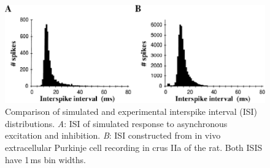 \documentclass[12pt]{article}
\begin{document}
\clearpage

\begin{figure}[h]
\centering
   \includegraphics[scale=0.75]{figures/Fig.2.8.eps}
   \caption{Comparison of simulated and experimental interspike interval (ISI) distributions. {\it A}: ISI of simulated response to asynchronous excitation and inhibition. {\it B}: ISI constructed from in vivo extracellular Purkinje cell recording in crus IIa of the rat. Both ISIS have 1\,ms bin widths.}
   \label{fig:DS2.8}
\end{figure}

\clearpage
\end{document}
